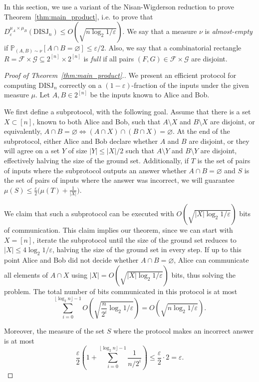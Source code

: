 \documentclass[11pt]{amsart}
\theoremstyle{definition}
\def\eps{\varepsilon}
\def\cF{\mathcal{F}}
\def\cG{\mathcal{G}}
\def\Pb{\mathbb{P}}
\newcommand{\DISJ}{\mathrm{DISJ}}
\begin{document}
In this section, we use a variant of the Nisan-Wigderson reduction \cite{NW} to prove Theorem~\ref{thm:main_product}, i.e. to prove that $D^{\mu_A\times \mu_B}_\eps(\DISJ_n)\leq O(\sqrt{n\log_2 1/\eps})$. We say that a measure $\nu$ is \textit{almost-empty} if $\Pb_{(A, B)\sim \nu}[A\cap B=\varnothing]\leq \eps/2$. Also, we say that a combinatorial rectangle $R=\cF\times \cG\subseteq 2^{[n]}\times 2^{[n]}$ is \textit{full} if all pairs $(F, G)\in \cF\times \cG$ are disjoint.

\begin{proof}[Proof of Theorem~\ref{thm:main_product}.]
We present an efficient protocol for computing $\DISJ_n$ correctly on a $(1-\eps)$-fraction of the inputs under the given measure $\mu$. Let $A, B\in 2^{[n]}$ be the inputs known to Alice and Bob. 

We first define a subprotocol, with the following goal. Assume that there is a set $X\subset [n]$, known to both Alice and Bob, such that $A\setminus X$ and $B\setminus X$ are disjoint, or equivalently, $A\cap B=\varnothing \Leftrightarrow (A\cap X)\cap (B\cap X)=\varnothing$. At the end of the subprotocol, either Alice and Bob declare whether $A$ and $B$ are disjoint, or they will agree on a set $Y$ of size $|Y|\leq |X|/2$ such that $A\setminus Y$ and $B\setminus Y$ are disjoint, effectively halving the size of the ground set. Additionally, if $T$ is the set of pairs of inputs where the subprotocol outputs an answer whether $A\cap B=\varnothing$ and $S$ is the set of pairs of inputs where the answer was incorrect, we will guarantee $\mu(S)\leq \frac{\eps}{2}\big( \mu(T)+\frac{1}{|X|}\big)$.

We claim that such a subprotocol can be executed with $O(\sqrt{|X|\log_2 1/\eps})$ bits of communication. This claim implies our theorem, since we can start with $X=[n]$, iterate the subprotocol until the size of the ground set reduces to $|X|\leq 4\log_2 1/\eps$, halving the size of the ground set in every step. If up to this point Alice and Bob did not decide whether $A\cap B=\varnothing$, Alice can communicate all elements of $A\cap X$ using $|X|=O(\sqrt{|X|\log_2 1/\eps})$ bits, thus solving the problem. The total number of bits communicated in this protocol is at most
$$\sum_{i=0}^{\lfloor \log_2 n\rfloor-1}O\left(\sqrt{\frac{n}{2^i} \log_2 1/\eps}\right)=O(\sqrt{n\log_2 1/\eps}).$$

Moreover, the measure of the set $S$ where the protocol makes an incorrect answer is at most $$\frac{\eps}{2}\left(1+\sum_{i=0}^{\lfloor \log_2 n\rfloor-1}\frac{1}{n/2^i}\right)\leq \frac{\eps}{2}\cdot 2=\eps.$$


\end{proof}
\end{document}
